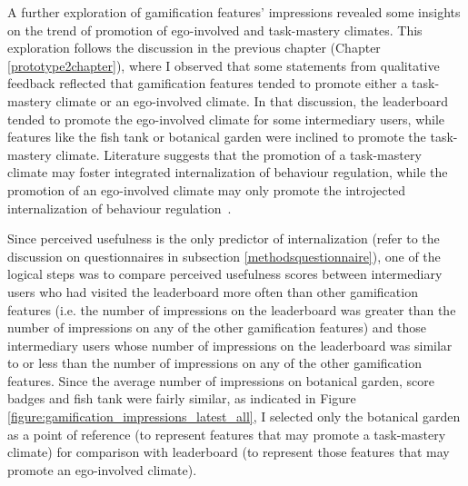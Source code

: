 A further exploration of gamification features' impressions revealed some insights on the trend of promotion of ego-involved and task-mastery climates. This exploration follows the discussion in the previous chapter (Chapter \ref{prototype2chapter}), where I observed that some statements from qualitative feedback reflected that gamification features tended to promote either a task-mastery climate or an ego-involved climate. In that discussion, the leaderboard tended to promote the ego-involved climate for some intermediary users, while features like the fish tank or botanical garden were inclined to promote the task-mastery climate. Literature suggests that the promotion of a task-mastery climate may foster integrated internalization of behaviour regulation, while the promotion of an ego-involved climate may only promote the introjected internalization of behaviour regulation~\citep{saksono2015spaceship}.

Since perceived usefulness is the only predictor of internalization (refer to the discussion on questionnaires in subsection \ref{methodsquestionnaire}), one of the logical steps was to compare perceived usefulness scores between intermediary users who had visited the leaderboard more often than other gamification features (i.e. the number of impressions on the leaderboard was greater than the number of impressions on any of the other gamification features) and those intermediary users whose number of impressions on the leaderboard was similar to or less than the number of impressions on any of the other gamification features. Since the average number of impressions on botanical garden, score badges and fish tank were fairly similar, as indicated in Figure \ref{figure:gamification_impressions_latest_all}, I selected only the botanical garden as a point of reference (to represent features that may promote a task-mastery climate) for comparison with leaderboard (to represent those features that may promote an ego-involved climate). 

